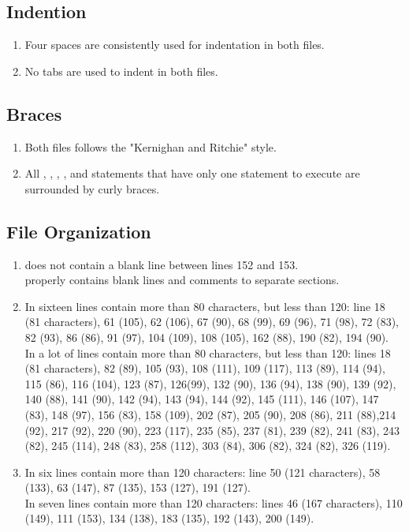 \subsection{Indention}
\begin{enumerate}[NUM]
    \item Four spaces are consistently used for indentation in both files.
    
    \item No tabs are used to indent in both files.
\end{enumerate}

\subsection{Braces}
\begin{enumerate}[NUM]
    \item Both files follows the "Kernighan and Ritchie" style.
   
    \item All , , , , and  statements that have only one statement to execute are surrounded by curly braces.
\end{enumerate}

\subsection{File Organization}
\begin{enumerate}[NUM]
    \item {} does not contain a blank line between lines 152 and 153.\\
     properly contains blank lines and comments to separate sections.
    
    \item In  sixteen lines contain more than 80 characters, but less than 120: line 18 (81 characters), 61 (105), 62 (106), 67 (90), 68 (99), 69 (96), 71 (98), 72 (83), 82 (93), 86 (86), 91 (97), 104 (109), 108 (105), 162 (88), 190 (82), 194 (90).\\
    In  a lot of lines contain more than 80 characters, but less than 120: lines 18 (81 characters), 82 (89), 105 (93), 108 (111), 109 (117), 113 (89), 114 (94), 115 (86), 116 (104), 123 (87), 126(99), 132 (90), 136 (94), 138 (90), 139 (92), 140 (88), 141 (90), 142 (94), 143 (94), 144 (92), 145 (111), 146 (107), 147 (83), 148 (97), 156 (83), 158 (109), 202 (87), 205 (90), 208 (86), 211 (88),214 (92), 217 (92), 220 (90), 223 (117), 235 (85), 237 (81), 239 (82), 241 (83), 243 (82), 245 (114), 248 (83), 258 (112), 303 (84), 306 (82), 324 (82), 326 (119).  
    
    \item In  six lines contain more than 120 characters: line 50 (121 characters), 58 (133), 63 (147), 87 (135), 153 (127), 191 (127).\\
    In  seven lines contain more than 120 characters: lines 46 (167 characters), 110 (149), 111 (153), 134 (138), 183 (135), 192 (143), 200 (149).
\end{enumerate}

